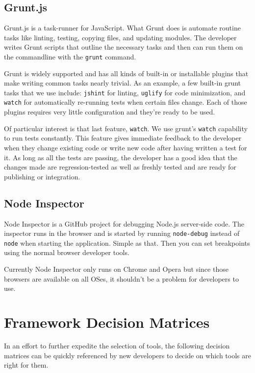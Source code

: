 \documentclass[12pt]{ucthesis}
\begin{document}
\subsection{Grunt.js}
Grunt.js\cite{GruntJS} is a task-runner for JavaScript. What Grunt does is automate routine tasks like linting, testing, copying files, and updating modules. The developer writes Grunt scripts that outline the necessary tasks and then can run them on the commandline with the \lstinline{grunt} command.

Grunt is widely supported and has all kinds of built-in or installable plugins that make writing common tasks nearly trivial. As an example, a few built-in grunt tasks that we use include: \lstinline{jshint} for linting, \lstinline{uglify} for code minimization, and \lstinline{watch} for automatically re-running tests when certain files change. Each of those plugins requires very little configuration and they're ready to be used.

Of particular interest is that last feature, \lstinline{watch}. We use grunt's \lstinline{watch} capability to run tests constantly. This feature gives immediate feedback to the developer when they change existing code or write new code after having written a test for it. As long as all the tests are passing, the developer has a good idea that the changes made are regression-tested as well as freshly tested and are ready for publishing or integration.

\subsection{Node Inspector}
Node Inspector\cite{NodeInspector} is a GitHub project for debugging Node.js server-side code. The inspector runs in the browser and is started by running \lstinline{node-debug} instead of \lstinline{node} when starting the application. Simple as that. Then you can set breakpoints using the normal browser developer tools.

Currently Node Inspector only runs on Chrome and Opera but since those browsers are available on all OSes, it shouldn't be a problem for developers to use.

\section{Framework Decision Matrices}
In an effort to further expedite the selection of tools, the following decision matrices can be quickly referenced by new developers to decide on which tools are right for them.
\end{document}
